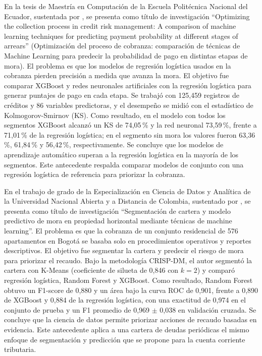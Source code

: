 \documentclass[12pt,a4paper]{report}
\begin{document}
En la tesis de Maestría en Computación de la Escuela Politécnica Nacional del Ecuador, sustentada por \textcite{carrera2024}, se presenta como título de investigación ``Optimizing the collection process in credit risk management: A comparison of machine learning techniques for predicting payment probability at different stages of arrears'' (Optimización del proceso de cobranza: comparación de técnicas de Machine Learning para predecir la probabilidad de pago en distintas etapas de mora). El problema es que los modelos de regresión logística usados en la cobranza pierden precisión a medida que avanza la mora. El objetivo fue comparar XGBoost y redes neuronales artificiales con la regresión logística para generar puntajes de pago en cada etapa. Se trabajó con 125,459 registros de créditos y 86 variables predictoras, y el desempeño se midió con el estadístico de Kolmogorov-Smirnov (KS). Como resultado, en el modelo con todos los segmentos XGBoost alcanzó un KS de 74,05\,\% y la red neuronal 73,59\,\%, frente a 71,01\,\% de la regresión logística; en el segmento sin mora los valores fueron 63,36\,\%, 61,84\,\% y 56,42\,\%, respectivamente. Se concluye que los modelos de aprendizaje automático superan a la regresión logística en la mayoría de los segmentos. Este antecedente respalda comparar modelos de conjunto con una regresión logística de referencia para priorizar la cobranza.

En el trabajo de grado de la Especialización en Ciencia de Datos y Analítica de la Universidad Nacional Abierta y a Distancia de Colombia, sustentado por \textcite{lismoncaleano2026}, se presenta como título de investigación ``Segmentación de cartera y modelo predictivo de mora en propiedad horizontal mediante técnicas de machine learning''. El problema es que la cobranza de un conjunto residencial de 576 apartamentos en Bogotá se basaba solo en procedimientos operativos y reportes descriptivos. El objetivo fue segmentar la cartera y predecir el riesgo de mora para priorizar el recaudo. Bajo la metodología CRISP-DM, el autor segmentó la cartera con K-Means (coeficiente de silueta de 0,846 con $k=2$) y comparó regresión logística, Random Forest y XGBoost. Como resultado, Random Forest obtuvo un F1-score de 0,880 y un área bajo la curva ROC de 0,901, frente a 0,890 de XGBoost y 0,884 de la regresión logística, con una exactitud de 0,974 en el conjunto de prueba y un F1 promedio de 0,969 $\pm$ 0,038 en validación cruzada. Se concluye que la ciencia de datos permite priorizar acciones de recaudo basadas en evidencia. Este antecedente aplica a una cartera de deudas periódicas el mismo enfoque de segmentación y predicción que se propone para la cuenta corriente tributaria.
\end{document}
